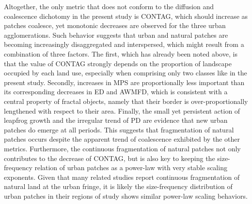 \documentclass[10pt,letterpaper]{article}
\begin{document}
Altogether, the only metric that does not conform to the diffusion and coalescence dichotomy in the present study is CONTAG, which should increase as patches coalesce, yet monotonic decreases are observed for the three urban agglomerations. Such behavior suggests that urban and natural patches are becoming increasingly disaggregated and interspersed, which might result from a combination of three factors.
The first, which has already been noted above, is that the value of CONTAG strongly depends on the proportion of landscape occupied by each land use, especially when comprising only two classes like in the present study.
Secondly, increases in MPS are proportionally less important than its corresponding decreases in ED and AWMFD, which is consistent with a central property of fractal objects, namely that their border is over-proportionally lengthened with respect to their area.
Finally, the small yet persistent action of leapfrog growth and the irregular trend of PD are evidence that new urban patches do emerge at all periods.
This suggests that fragmentation of natural patches occurs despite the apparent trend of coalescence exhibited by the other metrics.
Furthermore, the continuous fragmentation of natural patches not only contributes to the decrease of CONTAG, but is also key to keeping the size-frequency relation of urban patches as a power-law with very stable scaling exponents.
Given that many related studies report continuous fragmentation of natural land at the urban fringe, it is likely the size-frequency distribution of urban patches in their regions of study shows similar power-law scaling behaviors.
\end{document}
